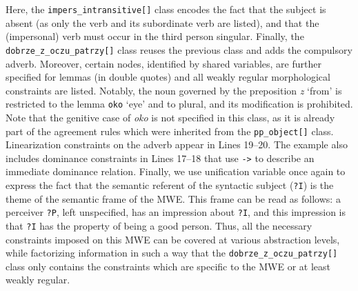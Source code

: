 \documentclass[output=paper]{langsci/langscibook}
\begin{document}
Here, the \texttt{impers\_intransitive[]} class encodes the fact that the subject is absent (as only the verb  and its subordinate verb are listed), and that the (impersonal) verb must occur in the third person singular. Finally, the \texttt{dobrze\_z\_oczu\_patrzy[]} class reuses the previous class and adds the compulsory adverb. Moreover, certain  nodes, identified by shared variables, are further specified for lemmas (in double quotes) and all weakly regular morphological constraints are listed. Notably, the noun governed by the preposition \textit{z} `from' is restricted to the lemma \texttt{oko} `eye' and to plural, and its modification is prohibited. Note that the genitive case of \textit{oko} is not specified in this class, as it is already part of the agreement rules which were inherited from the \texttt{pp\_object[]} class. Linearization constraints on the adverb appear in Lines 19--20. The example also includes dominance constraints in Lines 17--18 that use \texttt{->} to describe an immediate dominance relation. Finally, we use unification variable once again to express the fact that the semantic referent of the syntactic subject (\texttt{?I}) is the theme of the semantic frame of the MWE. This frame can be read as follows: a perceiver \texttt{?P}, left unspecified, has an impression about \texttt{?I}, and this impression is that \texttt{?I} has the property of being a good person. Thus, all the necessary constraints imposed on this MWE can be covered at various abstraction levels, while factorizing information in such a way that the \texttt{dobrze\_z\_oczu\_patrzy[]} class only contains the constraints which are specific to the MWE or at least weakly regular.
\end{document}
